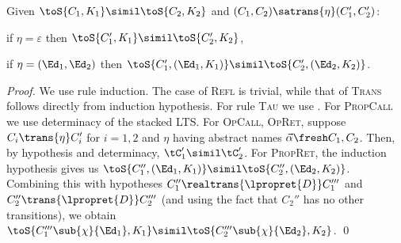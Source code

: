 

\begin{lemma}\label{lem:sat}
  Given $\toS{C_1,K_1}\simil \toS{C_2,K_2}$ and
  $(C_1,C_2)\satrans{\eta}(C_1',C_2')$:
  \begin{compactitem}
  \item if $\eta=\varepsilon$ then $\toS{C_1',K_1}\simil \toS{C_2',K_2}$,
      \item if $\eta=(\Ed_1,\Ed_2)$ then $\toS{C_1',(\Ed_1,K_1)}\simil \toS{C_2',(\Ed_2,K_2)}$.
  \end{compactitem}
\end{lemma}
\begin{proof}
  We use rule induction.
The case of \textsc{Refl} is trivial, while that of \textsc{Trans} follows directly from induction hypothesis. 
For rule \textsc{Tau} we use . For \textsc{PropCall} we  use determinacy of the stacked LTS. For \textsc{OpCall, OpRet}, suppose $C_i\trans{\eta}C_i'$ for $i=1,2$ and $\eta$ having abstract names $\vec\alpha\fresh C_1,C_2$.
Then, by hypothesis and determinacy,  $\tC_1'\simil\tC_2'$.
For \textsc{PropRet}, the induction hypothesis gives us $\toS{C_1'',(\Ed_1,K_1)}\simil \toS{C_2'',(\Ed_2,K_2)}$. Combining this with hypotheses
      $C_1''\realtrans{\lpropret{D}}C_1'''$ and
$C_2''\trans{\lpropret{D}} C_2'''$ (and using the fact that $C_2''$ has no other transitions),
we obtain $\toS{C_1'''\sub{\chi}{\Ed_1},K_1}\simil \toS{C_2'''\sub{\chi}{\Ed_2},K_2}$.
\qed
\end{proof}

